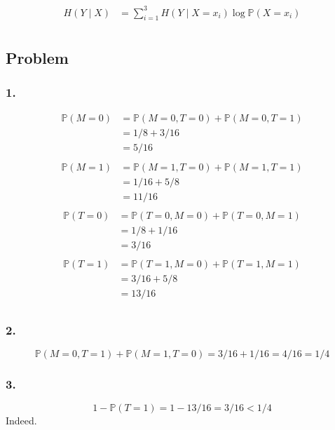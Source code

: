 \documentclass{article}
\newcommand{\1}{\mathbf{1}}
\renewcommand{\P}{\mathbb{P}}
\begin{document}
\begin{align*}
  H(Y \mid X)
   & = \sum_{i=1}^3 H(Y \mid X = x_i) \log \P(X = x_i) \\
\end{align*}

\subsection{Problem}

\subsubsection{1.}

\begin{align*}
  \P(M = 0)
   & = \P(M = 0, T = 0) + \P(M = 0, T = 1) \\
   & = 1/8 + 3/16                          \\
   & = 5/16                                \\
\end{align*}
\begin{align*}
  \P(M = 1)
   & = \P(M = 1, T = 0) + \P(M = 1, T = 1) \\
   & = 1/16 + 5/8                          \\
   & = 11/16                               \\
\end{align*}
\begin{align*}
  \P(T = 0)
   & = \P(T = 0, M = 0) + \P(T = 0, M = 1) \\
   & = 1/8 + 1/16                          \\
   & = 3/16                                \\
\end{align*}
\begin{align*}
  \P(T = 1)
   & = \P(T = 1, M = 0) + \P(T = 1, M = 1) \\
   & = 3/16 + 5/8                          \\
   & = 13/16                               \\
\end{align*}

\subsubsection{2.}
$$
  \P(M = 0, T = 1) + \P(M = 1, T = 0) = 3/16 + 1/16 = 4/16 = 1/4
$$

\subsubsection{3.}
$$
  1 - \P(T = 1) = 1 - 13/16 = 3/16 < 1/4
$$
Indeed.
\end{document}
